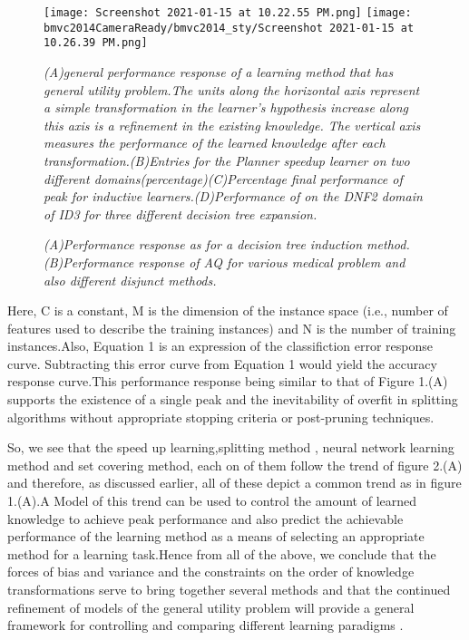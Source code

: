 \documentclass[extendedabs]{bmvc2k}
\begin{document}
\begin{figure}[t]
\texttt{[image: Screenshot 2021-01-15 at 10.22.55 PM.png]}
\texttt{[image: bmvc2014CameraReady/bmvc2014\_sty/Screenshot 2021-01-15 at 10.26.39 PM.png]}
\caption{
\textit{ (A)general performance response of a learning method that has general utility problem.The units along the horizontal axis represent a simple transformation in the learner’s hypothesis increase along this axis is a refinement in the existing knowledge. The vertical axis measures the performance of the learned knowledge after each transformation.(B)Entries for the Planner speedup learner on two different domains(percentage)(C)Percentage final performance of peak for inductive learners.(D)Performance of  on the DNF2 domain  of ID3 for three different decision tree expansion.} }
\caption{
\textit{ (A)Performance response as for a decision tree induction method. (B)Performance response of AQ for various medical problem and also different disjunct methods.} }

\vspace{-1mm}
\end{figure}
 Here, C is a constant, M is the dimension of the instance space (i.e., number of features used to describe the training instances) and N is the number of training instances.Also, Equation 1 is an expression of the classifiction error response curve.\newline
 Subtracting this error curve from Equation 1 would yield the accuracy response curve.This performance response being similar to that of Figure 1.(A) supports the existence of a single peak and the inevitability of overfit in splitting algorithms without appropriate stopping criteria or post-pruning techniques.\par
So, we see that the speed up learning,splitting method , neural network learning method and set covering method, each on of them follow the trend of figure 2.(A) and therefore, as discussed earlier, all of these depict a common trend as in figure 1.(A).A Model of this trend can be used to control the amount of learned knowledge to achieve peak performance and also predict the achievable performance of the learning method as a means of selecting an appropriate method for a learning task.Hence from all of the above, we conclude that the forces of bias and variance and the constraints on the order of knowledge transformations serve to bring together several methods and that the continued refinement of models of the general utility problem will provide a general framework for controlling and comparing different learning paradigms .\newline
\end{document}
